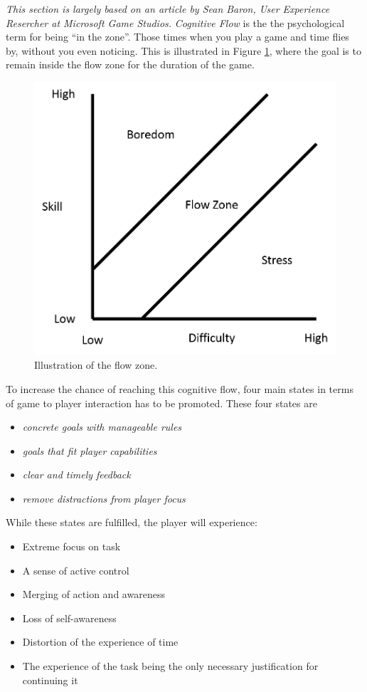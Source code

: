 \emph{This section is largely based on an article by Sean Baron, User Experience Resercher at Microsoft Game
Studios\cite{baron}.}
\emph{Cognitive Flow} is the the psychological term for being ``in the zone''. Those times when you play a game and
time flies by, without you even noticing. 
This is illustrated in Figure \ref{gamedesign:flowzone}, where the goal is
to remain inside the flow zone for the duration of the game.
\begin{figure}
    \includegraphics[scale=0.5]{figures/gamedesign/flowZone}
    \caption{Illustration of the flow zone.}
    \label{gamedesign:flowzone}
\end{figure}

To increase the chance of reaching this cognitive flow, four main states in terms of game to player interaction has to
be promoted.  These four states are 
\begin{itemize}
    \item \emph{concrete goals with manageable rules}
    \item \emph{goals that fit player capabilities}
    \item \emph{clear and timely feedback}
    \item \emph{remove distractions from player focus}
\end{itemize} While these states are fulfilled, the player will experience:

\begin{itemize}
    \item Extreme focus on task
    \item A sense of active control
    \item Merging of action and awareness
    \item Loss of self-awareness
    \item Distortion of the experience of time
    \item The experience of the task being the only necessary justification for continuing it
\end{itemize}

